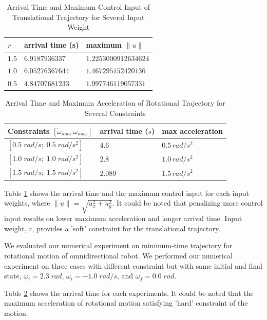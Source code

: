 \documentclass[conference]{IEEEtran}
\begin{document}
\begin{table}[ht!]
\caption{Arrival Time and Maximum Control Input of Translational Trajectory for Several Input Weight}
\label{trajectories_table}
\centering
\begin{tabular}{|l|l|l|}
\hline
$r$ & arrival time (s) & maximum $\| u \|$ \\ \hline
$1.5$ & $6.9187936337$ & $1.2253000912634624$ \\ \hline
$1.0$ & $6.05276367644$ & $1.467295152420136$ \\ \hline
$0.5$ & $4.84707681233$ & $1.997746119057331$ \\ \hline
\end{tabular}
\end{table}
\begin{table}[ht!]
\caption{Arrival Time and Maximum Acceleration of Rotational Trajectory for Several Constraints}
\label{angular_trajectory_table}
\centering
\begin{tabular}{|l|l|l|}
\hline
Constraints                                                   $[\dot{\omega}_{max}\,\ddot{\omega}_{max}]$ & arrival time ($s$) & max acceleration \\ \hline
$[0.5\;rad/s;\;0.5\;rad/s^2]$ & $4.6$   & $0.5\,rad/s^2$           \\ \hline
$[1.0\;rad/s;\;1.0\;rad/s^2]$ & $2.8$   & $1.0\,rad/s^2$           \\ \hline
$[1.5\;rad/s;\;1.5\;rad/s^2]$ & $2.089$ & $1.5\,rad/s^2$         \\ \hline
\end{tabular}
\end{table}
Table \ref{trajectories_table} shows the arrival time and the maximum control input for each input weights, where $\|u\| = \sqrt{u_x^2+u_y^2}$. It could be noted that penalizing more control input results on lower maximum acceleration and longer arrival time. Input weight, $r$, provides a 'soft' constraint for the translational trajectory.

We evaluated our numerical experiment on minimum-time trajectory for rotational motion of omnidirectional robot. We performed our numerical experiment on three cases with different constraint but with same initial and final state, $\omega_{i}=2.3\;rad$, $\dot{\omega}_{i}=-1.0\;rad/s$, and $\omega_{f}=0.0\;rad$.

Table \ref{angular_trajectory_table} shows the arrival time for each experiments. It could be noted that the maximum acceleration of rotational motion satisfying 'hard' constraint of the motion.
\end{document}
